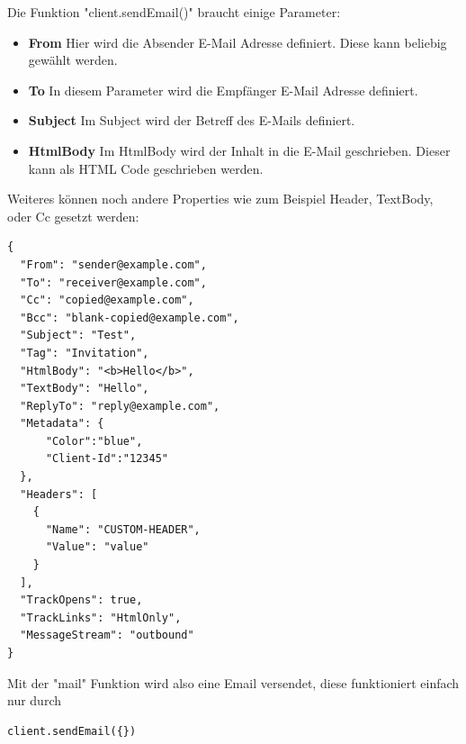 Die Funktion "client.sendEmail()" braucht einige Parameter:

\begin{itemize}
    \item \textbf{From}
        \newline
        Hier wird die Absender E-Mail Adresse definiert. Diese kann beliebig gewählt werden.
    \item \textbf{To}
        \newline
        In diesem Parameter wird die Empfänger E-Mail Adresse definiert.
    \item \textbf{Subject}
        \newline
        Im Subject wird der Betreff des E-Mails definiert.
    \item \textbf{HtmlBody}
        \newline
        Im HtmlBody wird der Inhalt in die E-Mail geschrieben. Dieser kann als HTML Code geschrieben werden.
\end{itemize}


Weiteres können noch andere Properties wie zum Beispiel Header, TextBody, oder Cc gesetzt werden:

\begin{lstlisting}[caption=Properties Postmark]
{
  "From": "sender@example.com",
  "To": "receiver@example.com",
  "Cc": "copied@example.com",
  "Bcc": "blank-copied@example.com",
  "Subject": "Test",
  "Tag": "Invitation",
  "HtmlBody": "<b>Hello</b>",
  "TextBody": "Hello",
  "ReplyTo": "reply@example.com",
  "Metadata": {
      "Color":"blue",
      "Client-Id":"12345"
  },
  "Headers": [
    {
      "Name": "CUSTOM-HEADER",
      "Value": "value"
    }
  ],
  "TrackOpens": true,
  "TrackLinks": "HtmlOnly",
  "MessageStream": "outbound"
}
\end{lstlisting}


Mit der "mail" Funktion wird also eine Email versendet, diese funktioniert einfach nur durch 
\begin{lstlisting}
client.sendEmail({})
\end{lstlisting}
